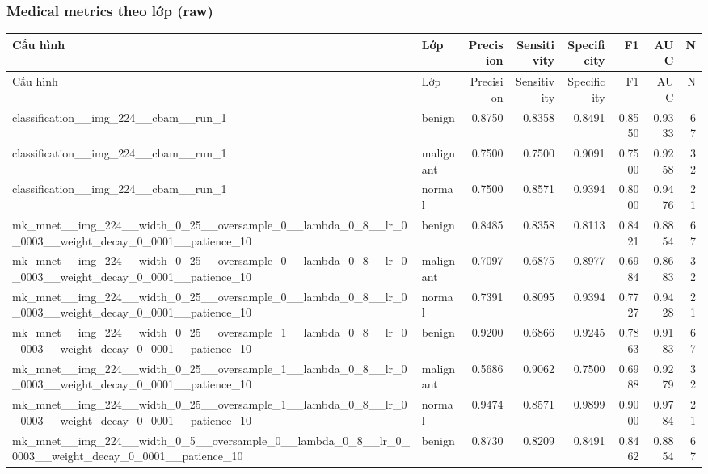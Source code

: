 \subsubsection*{Medical metrics theo lớp (raw)}
\scriptsize
\begin{longtable}{p{4.2cm}lrrrrrr}
\toprule
Cấu hình & Lớp & Precision & Sensitivity & Specificity & F1 & AUC & N \\
\midrule
\endfirsthead
\toprule
Cấu hình & Lớp & Precision & Sensitivity & Specificity & F1 & AUC & N \\
\midrule
\endhead
classification\_\_img\_224\_\_cbam\_\_run\_1 & benign & 0.8750 & 0.8358 & 0.8491 & 0.8550 & 0.9333 & 67 \\
classification\_\_img\_224\_\_cbam\_\_run\_1 & malignant & 0.7500 & 0.7500 & 0.9091 & 0.7500 & 0.9258 & 32 \\
classification\_\_img\_224\_\_cbam\_\_run\_1 & normal & 0.7500 & 0.8571 & 0.9394 & 0.8000 & 0.9476 & 21 \\
mk\_mnet\_\_img\_224\_\_width\_0\_25\_\_oversample\_0\_\_lambda\_0\_8\_\_lr\_0\_0003\_\_weight\_decay\_0\_0001\_\_patience\_10 & benign & 0.8485 & 0.8358 & 0.8113 & 0.8421 & 0.8854 & 67 \\
mk\_mnet\_\_img\_224\_\_width\_0\_25\_\_oversample\_0\_\_lambda\_0\_8\_\_lr\_0\_0003\_\_weight\_decay\_0\_0001\_\_patience\_10 & malignant & 0.7097 & 0.6875 & 0.8977 & 0.6984 & 0.8683 & 32 \\
mk\_mnet\_\_img\_224\_\_width\_0\_25\_\_oversample\_0\_\_lambda\_0\_8\_\_lr\_0\_0003\_\_weight\_decay\_0\_0001\_\_patience\_10 & normal & 0.7391 & 0.8095 & 0.9394 & 0.7727 & 0.9428 & 21 \\
mk\_mnet\_\_img\_224\_\_width\_0\_25\_\_oversample\_1\_\_lambda\_0\_8\_\_lr\_0\_0003\_\_weight\_decay\_0\_0001\_\_patience\_10 & benign & 0.9200 & 0.6866 & 0.9245 & 0.7863 & 0.9183 & 67 \\
mk\_mnet\_\_img\_224\_\_width\_0\_25\_\_oversample\_1\_\_lambda\_0\_8\_\_lr\_0\_0003\_\_weight\_decay\_0\_0001\_\_patience\_10 & malignant & 0.5686 & 0.9062 & 0.7500 & 0.6988 & 0.9279 & 32 \\
mk\_mnet\_\_img\_224\_\_width\_0\_25\_\_oversample\_1\_\_lambda\_0\_8\_\_lr\_0\_0003\_\_weight\_decay\_0\_0001\_\_patience\_10 & normal & 0.9474 & 0.8571 & 0.9899 & 0.9000 & 0.9784 & 21 \\
mk\_mnet\_\_img\_224\_\_width\_0\_5\_\_oversample\_0\_\_lambda\_0\_8\_\_lr\_0\_0003\_\_weight\_decay\_0\_0001\_\_patience\_10 & benign & 0.8730 & 0.8209 & 0.8491 & 0.8462 & 0.8854 & 67 \\

\end{longtable}
